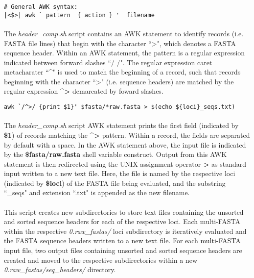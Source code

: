 \clearpage

\begin{lstlisting}[caption={Example AWK statement}]
# General AWK syntax:
|<$>| awk ` pattern  { action } '  filename
\end{lstlisting}

\vspace*{30pt}

\paragraph{} The \textit{header\_comp.sh} script contains an AWK statement to identify records (i.e. FASTA file lines) that begin with the character ``>", which denotes a FASTA sequence header.  Within an AWK statement, the pattern is a regular expression indicated between forward slashes ``/ /".  The regular expression caret metacharater ``\string^" is used to match the beginning of a record, such that records beginning with the character ``>" (i.e. sequence headers) are matched by the regular expression \textbf{\string^>} demarcated by foward slashes.

\vspace*{30pt}

\begin{lstlisting}[caption={\textit{header\_comp.sh} AWK statement to retrieve FASTA headers}]
awk `/^>/ {print $1}' $fasta/*raw.fasta > $(echo ${loci}_seqs.txt)
\end{lstlisting}

\vspace*{30pt}

\paragraph{} The \textit{header\_comp.sh} script AWK statement prints the first field (indicated by \textbf{\$1}) of records matching the \textbf{\string^>} pattern.  Within a record, the fields are separated by default with a space.  In the AWK statement above, the input file is indicated by the \textbf{\$fasta/\*raw.fasta} shell variable construct.  Output from this AWK statement is then redirected using the UNIX assignment operator \textbf{>} as standard input written to a new text file.  Here, the file is named by the respective loci (indicated by \textbf{\${loci}}) of the FASTA file being evaluated, and the substring ``\_seqs" and extension ``.txt" is appended as the new filename.  

\paragraph{} This script creates new subdirectories to store text files containing the unsorted and sorted sequence headers for each of the respective loci.  Each multi-FASTA within the respective \textit{0.raw\_fastas/} loci subdirectory is iteratively evaluated and the FASTA sequence headers written to a new text file.  For each multi-FASTA input file, two output files containing unsorted and sorted sequence headers are created and moved to the respective subdirectories within a new \textit{0.raw\_fastas/seq\_headers/} directory.  

